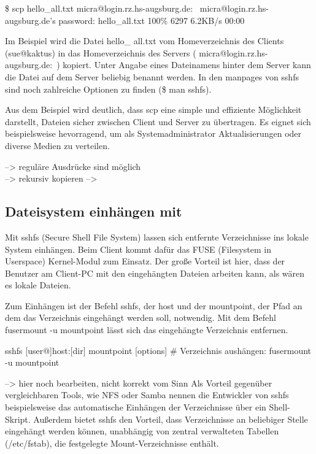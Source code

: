 \documentclass[ngerman,pdf]{wkcms}    %
\begin{document}
\begin{program}
\$ scp hello\_all.txt micra@login.rz.hs-augsburg.de:~
micra@login.rz.hs-augsburg.de's password:
hello\_all.txt        100\% 6297     6.2KB/s   00:00
\end{program}

Im Beispiel wird die Datei \IT hello\_ \IT all.txt vom Homeverzeichnis des Clients (sue@kaktus) in das Homeverzeichnis des Servers ( micra@login.rz.hs-augsburg.de:~) kopiert. Unter Angabe eines Dateinamens hinter dem Server kann die Datei auf dem Server beliebig benannt werden. In den manpages von sshfs sind noch zahlreiche Optionen zu finden (\$ man sshfs).

Aus dem Beispiel wird deutlich, dass \IT scp eine simple und effiziente Möglichkeit darstellt, Dateien sicher zwischen Client und Server zu übertragen. Es eignet sich beispielsweise hevorragend, um als Systemadministrator Aktualisierungen oder diverse Medien zu verteilen. \cite[S. 80]{openssh_book}

--> reguläre Ausdrücke sind möglich \\
--> rekursiv kopieren
--> 

\subsection{Dateisystem einhängen mit }

Mit \IT sshfs (\IT Secure \IT Shell \IT File \IT System) lassen sich entfernte Verzeichnisse ins lokale System einhängen. Beim Client kommt dafür das FUSE (Filesystem in Userspace) Kernel-Modul zum Einsatz. Der große Vorteil ist hier, dass der Benutzer am Client-PC mit den eingehängten Dateien arbeiten kann, als wären es lokale Dateien.

Zum Einhängen ist der Befehl \IT sshfs, der \IT host und der \IT mountpoint,
\Dh der Pfad an dem das Verzeichnis eingehängt werden soll, notwendig.
Mit dem Befehl \IT fusermount \IT -u \IT mountpoint lässt sich das eingehängte Verzeichnis entfernen.

\begin{program}
sshfs [user@]host:[dir] mountpoint [options]
# Verzeichnis aushängen:
fusermount -u mountpoint
\end{program}

--> hier noch bearbeiten, nicht korrekt vom Sinn
Als Vorteil gegenüber vergleichbaren Tools, wie NFS oder Samba nennen die Entwickler von \IT sshfs beispielsweise das automatische Einhängen der Verzeichnisse über ein Shell-Skript. Außerdem bietet \IT sshfs den Vorteil, dass Verzeichnisse an beliebiger Stelle eingehängt werden können, unabhängig von zentral verwalteten Tabellen (/etc/fstab), die festgelegte Mount-Verzeichnisse enthält. \cite{sshfs}
\end{document}
